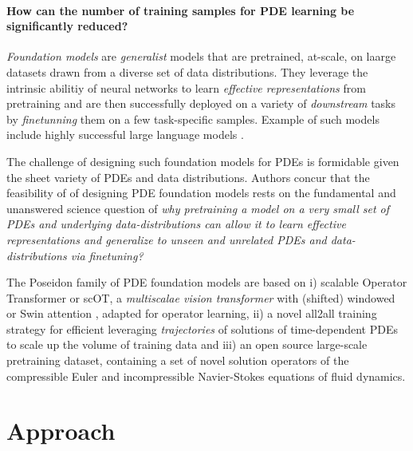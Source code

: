 \documentclass[reqno,10pt]{amsart}
\theoremstyle{plain}
\theoremstyle{definition}
\begin{document}
\paragraph{\bf How can the number of training samples for PDE learning be significantly reduced?} 
{\it Foundation models} are {\it generalist} models that are pretrained, at-scale, on laarge datasets drawn from a diverse set of data distributions. They leverage the intrinsic abilitiy of neural networks to learn {\it effective representations} from pretraining and are then successfully deployed on a variety of {\it downstream} tasks by {\it finetunning} them on a few task-specific samples. Example of such models include highly successful large language models \cite{HT2023}.

\noindent The challenge of designing such foundation models for PDEs is formidable given the sheet variety of PDEs and data distributions. Authors concur that the feasibility of of designing PDE foundation models rests on the fundamental and unanswered science question of {\it why pretraining a model on a very small set of PDEs and underlying data-distributions can allow it to learn effective representations and generalize to unseen and unrelated PDEs and data-distributions via finetuning?}

\noindent The Poseidon family of PDE foundation models are based on i) scalable Operator Transformer or scOT, a {\it multiscalae vision transformer} with (shifted) windowed or Swin attention \cite{ZLiu2021}, adapted for operator learning, ii) a novel all2all training strategy for efficient leveraging {\it trajectories} of solutions of time-dependent PDEs to scale up the volume of training data and iii) an open source large-scale pretraining dataset, containing a set of novel solution operators of the compressible Euler and incompressible Navier-Stokes equations of fluid dynamics.

\section{\bf Approach}
\end{document}
